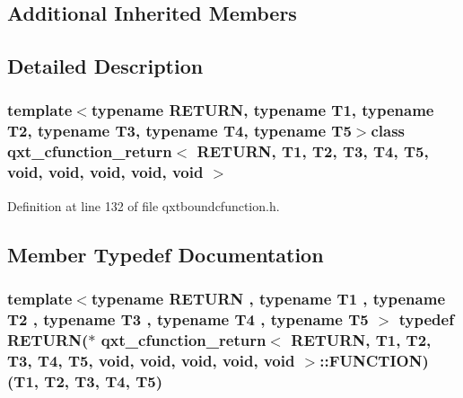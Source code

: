 \subsection*{Additional Inherited Members}


\subsection{Detailed Description}
\subsubsection*{template$<$typename R\-E\-T\-U\-R\-N, typename T1, typename T2, typename T3, typename T4, typename T5$>$class qxt\-\_\-cfunction\-\_\-return$<$ R\-E\-T\-U\-R\-N, T1, T2, T3, T4, T5, void, void, void, void, void $>$}



Definition at line 132 of file qxtboundcfunction.\-h.



\subsection{Member Typedef Documentation}
\hypertarget{classqxt__cfunction__return_3_01_r_e_t_u_r_n_00_01_t1_00_01_t2_00_01_t3_00_01_t4_00_01_t5_00_01va717bb511aabe427a3a25b2e1c17ca03_a14e13777b50b65b2d5a9c5be7be2d0ed}{
\subsubsection[{F\-U\-N\-C\-T\-I\-O\-N}]{\setlength{\rightskip}{0pt plus 5cm}template$<$typename R\-E\-T\-U\-R\-N , typename T1 , typename T2 , typename T3 , typename T4 , typename T5 $>$ typedef R\-E\-T\-U\-R\-N($\ast$ {\bf qxt\-\_\-cfunction\-\_\-return}$<$ R\-E\-T\-U\-R\-N, T1, T2, T3, T4, T5, {\bf void}, {\bf void}, {\bf void}, {\bf void}, {\bf void} $>$\-::F\-U\-N\-C\-T\-I\-O\-N)(T1, T2, T3, T4, T5)}}\label{classqxt__cfunction__return_3_01_r_e_t_u_r_n_00_01_t1_00_01_t2_00_01_t3_00_01_t4_00_01_t5_00_01va717bb511aabe427a3a25b2e1c17ca03_a14e13777b50b65b2d5a9c5be7be2d0ed}



